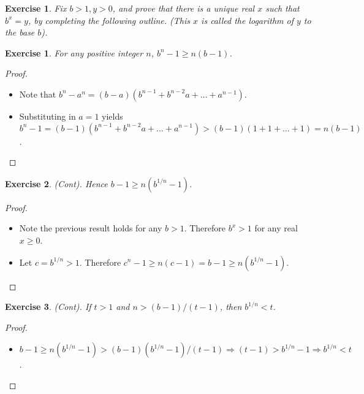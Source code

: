 \documentclass[12pt]{article}
\newtheorem{exercise}{Exercise}[section]
\newtheorem{subexercise}{Exercise}[exercise]
\begin{document}
\begin{exercise}
    Fix $b > 1, y > 0$, and prove that there is a unique real $x$ such that $b^x = y$, by completing the following outline. (This $x$ is called the \textit{logarithm of $y$ to the base $b$}).
\end{exercise}

\begin{subexercise}
    For any positive integer $n$, $b^n - 1 \geq n(b-1)$.
\end{subexercise}

\begin{proof}
    
    \begin{itemize}
        \item Note that $b^n - a^n = (b-a)(b^{n-1} + b^{n-2}a + \ldots + a^{n-1})$.
        \item Substituting in $a = 1$ yields $b^n - 1 = (b-1)(b^{n-1} + b^{n-2}a + \ldots + a^{n-1}) > (b-1)(1 + 1 + \ldots + 1) = n(b-1)$.
    \end{itemize}
    
\end{proof}

\begin{subexercise}
    (Cont). Hence $b-1 \geq n(b^{1/n} - 1)$.
\end{subexercise}

\begin{proof}
    
    \begin{itemize}
        \item Note the previous result holds for any $b > 1$. Therefore $b^x > 1$ for any real $x \geq 0$.
        \item Let $c = b^{1/n} > 1$. Therefore $c^n -1 \geq n(c-1) = b-1 \geq n(b^{1/n} - 1)$.
    \end{itemize}
    
\end{proof}

\begin{subexercise}
    (Cont). If $t>1$ and $n > (b-1)/(t-1)$, then $b^{1/n}<t$.
\end{subexercise}

\begin{proof}
    
    \begin{itemize}
        \item $b-1 \geq n(b^{1/n} - 1) > (b-1)(b^{1/n}-1)/(t-1) \Rightarrow (t-1) > b^{1/n} -1 \Rightarrow b^{1/n}<t$.
    \end{itemize}
    
\end{proof}
\end{document}
